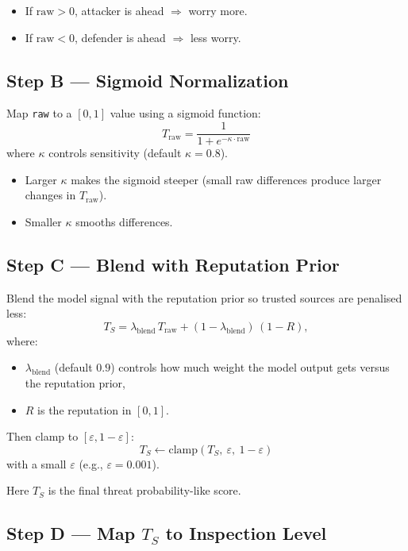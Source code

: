 \documentclass[12pt, a4paper]{report}
\begin{document}
\begin{itemize}
    \item If $\text{raw} > 0$, attacker is ahead $\Rightarrow$ worry more.
    \item If $\text{raw} < 0$, defender is ahead $\Rightarrow$ less worry.
\end{itemize}

\subsection*{Step B — Sigmoid Normalization}

Map \texttt{raw} to a $[0,1]$ value using a sigmoid function:
\[
T_{\text{raw}} = \frac{1}{1 + e^{-\kappa \cdot \text{raw}}}
\]
where $\kappa$ controls sensitivity (default $\kappa = 0.8$).

\begin{itemize}
    \item Larger $\kappa$ makes the sigmoid steeper (small raw differences
          produce larger changes in $T_{\text{raw}}$).
    \item Smaller $\kappa$ smooths differences.
\end{itemize}

\subsection*{Step C — Blend with Reputation Prior}

Blend the model signal with the reputation prior so trusted sources are penalised
less:
\[
T_S = \lambda_{\text{blend}} \, T_{\text{raw}} + (1 - \lambda_{\text{blend}})\,(1 - R),
\]
where:
\begin{itemize}
    \item $\lambda_{\text{blend}}$ (default $0.9$) controls how much weight the
          model output gets versus the reputation prior,
    \item $R$ is the reputation in $[0,1]$.
\end{itemize}

Then clamp to $[\varepsilon, 1 - \varepsilon]$:
\[
T_S \leftarrow \mathrm{clamp}(T_S,\ \varepsilon,\ 1-\varepsilon)
\]
with a small $\varepsilon$ (e.g., $\varepsilon = 0.001$).

Here $T_S$ is the final threat probability-like score.

\subsection*{Step D — Map $T_S$ to Inspection Level}
\end{document}
